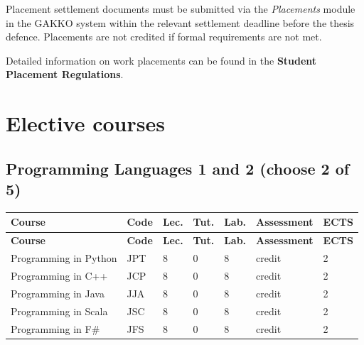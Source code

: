 \documentclass[12pt,a4paper]{article}
\newcommand{\thdrule}{\noalign{\global\setlength{\extrarowheight}{0pt}}}
\newcommand{\thdend}{\noalign{\global\setlength{\extrarowheight}{4pt}}}
\begin{document}
Placement settlement documents must be submitted via the \textit{Placements} module in the GAKKO system within the relevant settlement deadline before the thesis defence. Placements are not credited if formal requirements are not met.

Detailed information on work placements can be found in the \textbf{Student Placement Regulations}.

\newpage

\section{Elective courses}

\subsection*{Programming Languages 1 and 2 (choose 2 of 5)}

{\scriptsize
\begin{longtable}{m{5.5cm}m{0.8cm}m{1cm}m{1cm}m{1cm}m{1.7cm}m{0.7cm}}
\thdrule\toprule
\rowcolor{pjatkRed}
{\color{white}\footnotesize\textbf{\vphantom{Ag}Course}} & {\color{white}\footnotesize\textbf{\vphantom{Ag}Code}} & {\color{white}\footnotesize\textbf{\vphantom{Ag}Lec.}} & {\color{white}\footnotesize\textbf{\vphantom{Ag}Tut.}} & {\color{white}\footnotesize\textbf{\vphantom{Ag}Lab.}} & {\color{white}\footnotesize\textbf{\vphantom{Ag}Assessment}} & {\color{white}\footnotesize\textbf{\vphantom{Ag}ECTS}} \\
\midrule\thdend
\endfirsthead
\thdrule\toprule
\rowcolor{pjatkRed}
{\color{white}\footnotesize\textbf{\vphantom{Ag}Course}} & {\color{white}\footnotesize\textbf{\vphantom{Ag}Code}} & {\color{white}\footnotesize\textbf{\vphantom{Ag}Lec.}} & {\color{white}\footnotesize\textbf{\vphantom{Ag}Tut.}} & {\color{white}\footnotesize\textbf{\vphantom{Ag}Lab.}} & {\color{white}\footnotesize\textbf{\vphantom{Ag}Assessment}} & {\color{white}\footnotesize\textbf{\vphantom{Ag}ECTS}} \\
\midrule\thdend
\endhead
\rowcolor{tableRowLight} Programming in Python & JPT & 8 & 0 & 8 & {\scriptsize credit} & 2 \\
\rowcolor{tableRowAlt} Programming in C++ & JCP & 8 & 0 & 8 & {\scriptsize credit} & 2 \\
\rowcolor{tableRowLight} Programming in Java & JJA & 8 & 0 & 8 & {\scriptsize credit} & 2 \\
\rowcolor{tableRowAlt} Programming in Scala & JSC & 8 & 0 & 8 & {\scriptsize credit} & 2 \\
\rowcolor{tableRowLight} Programming in F\# & JFS & 8 & 0 & 8 & {\scriptsize credit} & 2 \\
\bottomrule
\end{longtable}}
\end{document}
